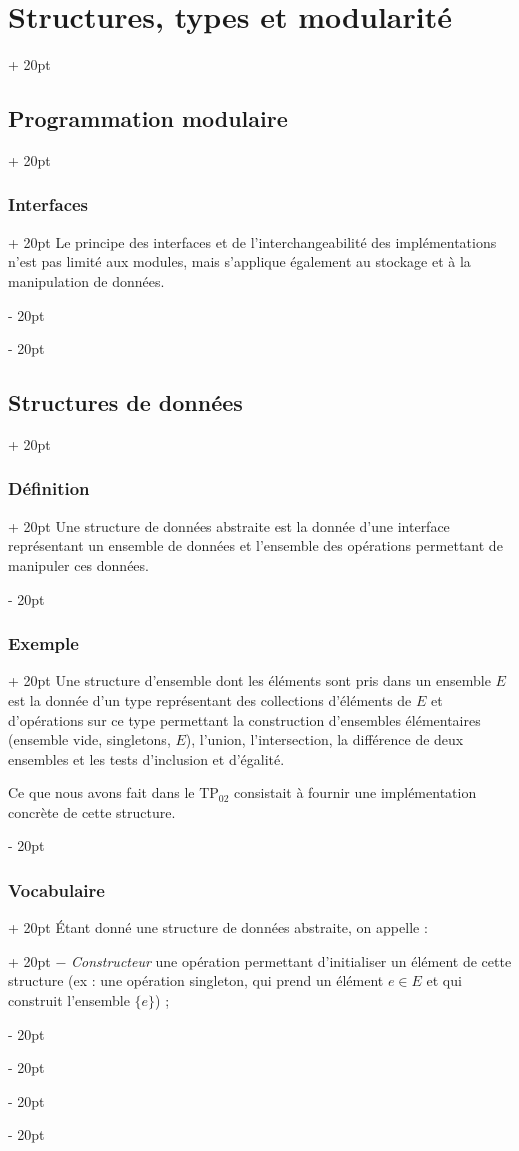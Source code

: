 \documentclass[a4paper, 12pt, twoside]{article}
\newcommand{\ind}[1][20pt]{\advance\leftskip + #1}
\newcommand{\deind}[1][20pt]{\advance\leftskip - #1}
\newenvironment{indt}[2][20pt]{#2 \par \ind[#1]}{\par \deind} %
\begin{document}
\begin{indt}{\section{Structures, types et modularité}}
\begin{indt}{\subsection{Programmation modulaire}}
\begin{indt}{\subsubsection{Interfaces}}
                Le principe des interfaces et de l’interchangeabilité des implémentations n’est pas limité aux modules, mais s’applique également au stockage et à la manipulation de données.
            \end{indt}
            
        \end{indt}
            
        \begin{indt}{\subsection{Structures de données}}
            
            \begin{indt}{\subsubsection{Définition}}
                Une structure de données abstraite est la donnée d’une interface représentant un ensemble de données et l’ensemble des opérations permettant de manipuler ces données.
            \end{indt}
            
            \begin{indt}{\subsubsection{Exemple}}
                Une structure d’ensemble dont les éléments sont pris dans un ensemble $E$ est la donnée d’un type représentant des collections d’éléments de $E$ et d’opérations sur ce type permettant la construction d’ensembles élémentaires (ensemble vide, singletons, $E$), l’union, l’intersection, la différence de deux ensembles et les tests d’inclusion et d’égalité.
                
                Ce que nous avons fait dans le TP$_{02}$ consistait à fournir une implémentation concrète de cette structure.
            \end{indt}
            
            \begin{indt}{\subsubsection{Vocabulaire}}
                \begin{indt}{Étant donné une structure de données abstraite, on appelle :}
                    $-$ \textit{Constructeur} une opération permettant d’initialiser un élément de cette structure (ex : une opération singleton, qui prend un élément $e \in E$ et qui construit l’ensemble $\{e\}$) ;
                    

\end{indt}
\end{indt}
\end{indt}
\end{indt}
\end{document}
